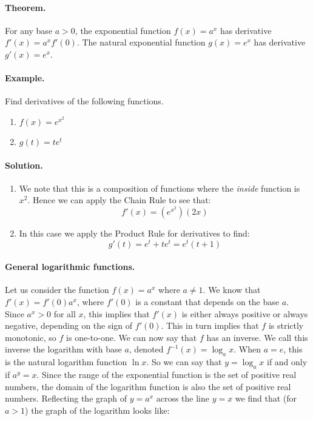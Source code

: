 \documentclass[12pt]{report}
\begin{document}
\paragraph{Theorem.} For any base $a>0$, the exponential function $f(x)=a^x$ has derivative $f'(x)=a^xf'(0)$. The natural exponential function $g(x)=e^x$ has derivative $g'(x)=e^x$.

\paragraph{Example.} Find derivatives of the following functions.
\begin{enumerate}
\item $f(x)=e^{x^2}$
\item $g(t)=t e^t$
\end{enumerate}

\paragraph{Solution.}
\begin{enumerate}
\item We note that this is a composition of functions where the \emph{inside} function is $x^2$. Hence we can apply the Chain Rule to see that: \[f'(x)=\left(e^{x^2}\right) (2x)\]
\item In this case we apply the Product Rule for derivatives to find: \[g'(t)=e^t+te^t=e^t(t+1)\]
\end{enumerate}

\paragraph{General logarithmic functions.} Let us consider the function $f(x)=a^x$ where $a\neq1$. We know that $f'(x)=f'(0)a^x$, where $f'(0)$ is a constant that depends on the base $a$. Since $a^x>0$ for all $x$, this implies that $f'(x)$ is either always positive or always negative, depending on the sign of $f'(0)$. This in turn implies that $f$ is strictly monotonic, so $f$ is one-to-one. We can now say that $f$ has an inverse. We call this inverse the logarithm with base $a$, denoted $f^{-1}(x)=\log_ax$. When $a=e$, this is the natural logarithm function $\ln x$. So we can say that $y=\log_a x$ if and only if $a^y=x$. Since the range of the exponential function is the set of positive real numbers, the domain of the logarithm function is also the set of positive real numbers. Reflecting the graph of $y=a^x$ across the line $y=x$ we find that (for $a>1$) the graph of the logarithm looks like:
\end{document}
